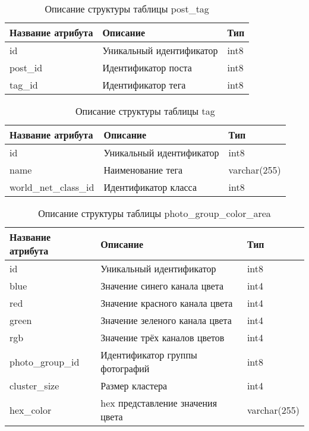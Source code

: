 \begin{table}[H]
  \caption{\onehalfspacing Описание структуры таблицы post_tag}\label{database-table-post-tag}
  \begin{tabular}{|p{6cm}|p{6cm}|p{4cm}|}
  \hline Название атрибута & Описание & Тип \\
  \hline id & Уникальный идентификатор & int8 \\
  \hline post_id & Идентификатор поста & int8 \\
  \hline tag_id & Идентификатор тега & int8 \\
  \hline
  \end{tabular}
\end{table}

\begin{table}[H]
  \caption{\onehalfspacing Описание структуры таблицы tag}\label{database-table-tag}
  \begin{tabular}{|p{6cm}|p{6cm}|p{4cm}|}
  \hline Название атрибута & Описание & Тип \\
  \hline id & Уникальный идентификатор & int8 \\
  \hline name & Наименование тега & varchar(255) \\
  \hline world_net_class_id & Идентификатор класса & int8\\
  \hline 
  \end{tabular}
\end{table}

\begin{table}[H]
  \caption{\onehalfspacing Описание структуры таблицы photo_group_color_area}\label{database-table-photo-group-color-area}
  \begin{tabular}{|p{6cm}|p{6cm}|p{4cm}|}
  \hline Название атрибута & Описание & Тип \\
  \hline id & Уникальный идентификатор & int8 \\
  \hline blue & Значение синего канала цвета & int4 \\
  \hline red & Значение красного канала цвета & int4 \\
  \hline green & Значение зеленого канала цвета & int4 \\
  \hline rgb & Значение трёх каналов цветов & int4 \\
  \hline photo_group_id & Идентификатор группы фотографий & int8 \\
  \hline cluster_size & Размер кластера & int4 \\
  \hline hex_color & hex представление значения цвета & varchar(255) \\
  \hline 
  \end{tabular}
\end{table}

